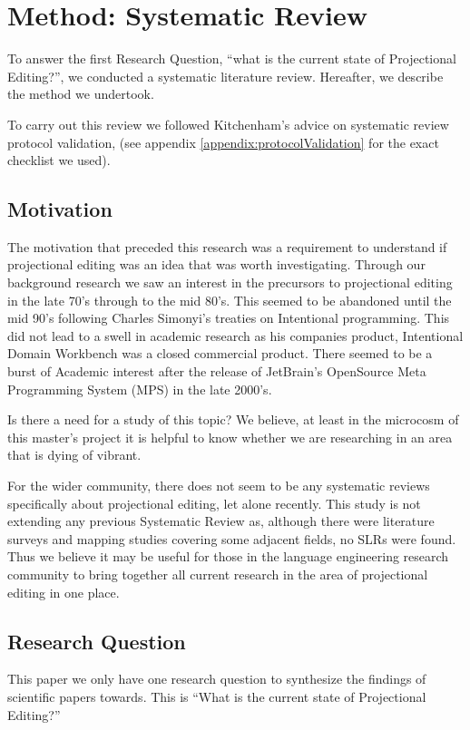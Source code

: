 \section{Method: Systematic Review}\label{section:Method_systematic_review}

To answer the first Research Question, ``what is the current state of Projectional Editing?'', we conducted a systematic literature review.
Hereafter, we describe the method we undertook.

To carry out this review we followed Kitchenham's\cite{Kitchenham_2015} advice on systematic review protocol validation, (see appendix \ref{appendix:protocolValidation} for the exact checklist we used).

\subsection{Motivation}
The motivation that preceded this research was a requirement to understand if projectional editing was an idea that was worth investigating.
Through our background research we saw an interest in the precursors to projectional editing in the late 70's through to the mid 80's.
This seemed to be abandoned until the mid 90's following Charles Simonyi's treaties on Intentional programming.
This did not lead to a swell in academic research as his companies product, Intentional Domain Workbench was a closed commercial product.
There seemed to be a burst of Academic interest after the release of JetBrain's OpenSource Meta Programming System (MPS) in the late 2000's.

Is there a need for a study of this topic? 
We believe, at least in the microcosm of this master's project it is helpful to know whether we are researching in an area that is dying of vibrant.

For the wider community, there does not seem to be any systematic reviews specifically about projectional editing, let alone recently.
This study is not extending any previous Systematic Review as, although there were literature surveys and mapping studies covering some adjacent fields, no SLRs were found.  
Thus we believe it may be useful for those in the language engineering research community to bring together all current research in the area of projectional editing in one place.

\subsection{Research Question}
This paper we only have one research question to synthesize the findings of scientific papers towards.
This is ``What is the current state of Projectional Editing?''

